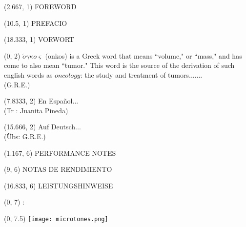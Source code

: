 \documentclass[10pt]{article}
\begin{document}
\begin{textblock}{23}(2.667, 1)
\huge FOREWORD
\end{textblock}

\begin{textblock}{23}(10.5, 1)
\huge PREFACIO
\end{textblock}

\begin{textblock}{23}(18.333, 1)
\huge VORWORT
\end{textblock}

\begin{textblock}{7.333}(0, 2)
$\acute{o} \gamma \kappa o \varsigma$ (onkos) is a Greek word that means ``volume," or ``mass," and has come to also mean ``tumor." This word is the source of the derivation of such english words as $oncology$: the study and treatment of tumors.......  \\
\phantom{text} \hfill (G.R.E.)
  \end{textblock}





\begin{textblock}{7.333}(7.8333, 2) 
En Espa\~nol... \\
\phantom{text}  \hfill (Tr : Juanita Pineda)
 \end{textblock}





\begin{textblock}{7.333}(15.666, 2) 
Auf Deutsch... \\
\phantom{text} \hfill (Übs: G.R.E.)
 \end{textblock}

\begin{textblock}{23}(1.167, 6)
\huge PERFORMANCE NOTES
\end{textblock}

\begin{textblock}{23}(9, 6)
\huge NOTAS DE RENDIMIENTO
\end{textblock}

\begin{textblock}{23}(16.833, 6)
\huge LEISTUNGSHINWEISE
\end{textblock}

\begin{textblock}{7.333}(0, 7)
:
\end{textblock}

\begin{textblock}{23}(0, 7.5)
\texttt{[image: microtones.png]}
\end{textblock}
\end{document}
